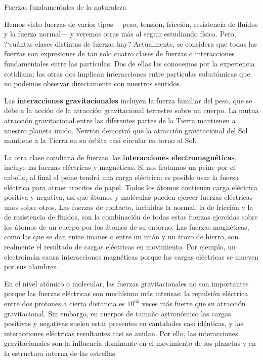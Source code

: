  \begin{myblock}{Fuerzas fundamentales de la naturaleza}
 
 \begin{small}
 Hemos visto fuerzas de varios tipos ---peso, tensión, fricción, resistencia de fluidos y la fuerza normal--- y veremos otras más al seguir estudiando física. Pero, ?`cuántas clases distintas de fuerzas hay? Actualmente, se considera que todas las fuerzas son expresiones de tan solo cuatro clases de fuerzas o interacciones fundamentales entre las partículas. Dos de ellas las conocemos por la experiencia cotidiana; las otras dos implican interacciones entre partículas subatómicas que no podemos observar directamente con nuestros sentidos. 

\vspace{2mm} Las \textbf{interacciones gravitacionales} incluyen la fuerza familiar del peso, que se debe a la acción de la atracción gravitacional terrestre sobre un cuerpo. La mutua atracción gravitacional entre las diferentes partes de la Tierra mantienen a nuestro planeta unido. Newton demostró que la atracción gravitacional del Sol mantiene a la Tierra en su órbita casi circular en torno al Sol. 

\vspace{2mm} La otra clase cotidiana de fuerzas, las \textbf{interacciones electromagnéticas}, incluye las fuerzas eléctricas y magnéticas. Si nos frotamos un peine por el cabello, al final el peine tendrá una carga eléctrica; es posible usar la fuerza eléctrica para atraer trocitos de papel. Todos los átomos contienen carga eléctrica positiva y negativa, así que átomos y moléculas pueden ejercer fuerzas eléctricas unos sobre otros.  Las fuerzas de contacto, incluidas la normal, la de fricción y la de resistencia de fluidos, son la combinación de todas estas fuerzas ejercidas sobre los átomos de un cuerpo por los átomos de su entorno. Las fuerzas magnéticas, como las que se dan entre imanes o entre un imán y un trozo de hierro, son realmente el resultado de cargas eléctricas en movimiento. Por ejemplo, un electroimán causa interacciones magnéticas porque las cargas eléctricas se mueven por sus alambres. 

\vspace{2mm} En el nivel atómico o molecular, las fuerzas gravitacionales no son importantes porque las fuerzas eléctricas son muchísimo más intensas: la repulsión eléctrica entre dos protones a cierta distancia es $10^{35}$ veces más fuerte que su atracción gravitacional. Sin embargo, en cuerpos de tamaño astronómico las cargas positivas y negativas suelen estar presentes en cantidades casi idénticas, y las interacciones eléctricas resultantes casi se anulan. Por ello, las interacciones gravitacionales son la influencia dominante en el movimiento de los planetas y en la estructura interna de las estrellas. 


\end{small}
\end{myblock}
